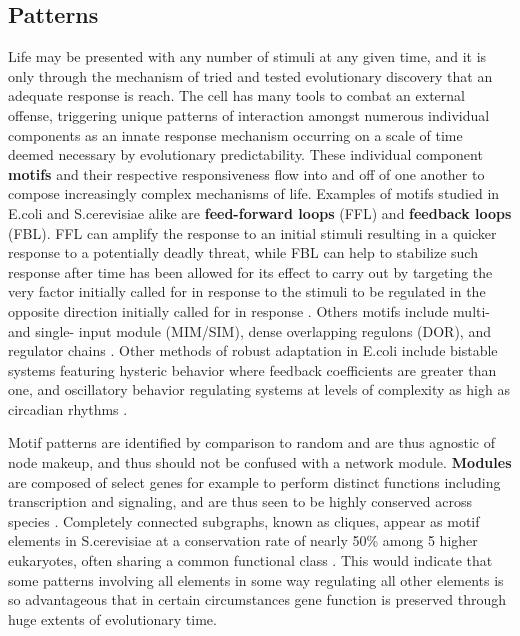 \subsection{Patterns}
\label{sec:pat}
Life may be presented with any number of stimuli at any given time, and it is only through the mechanism of tried and tested evolutionary discovery that an adequate response is reach. The cell has many tools to combat an external offense, triggering unique patterns of interaction amongst numerous individual components as an innate response mechanism occurring on a scale of time deemed necessary by evolutionary predictability. These individual component \textbf{motifs} and their respective responsiveness flow into and off of one another to compose increasingly complex mechanisms of life. Examples of motifs studied in E.coli  and S.cerevisiae alike are \textbf{feed-forward loops} (FFL) and \textbf{feedback loops} (FBL).  FFL can amplify the response to an initial stimuli resulting in a quicker response to a potentially deadly threat, while FBL can help to stabilize such response after time has been allowed for its effect to carry out by targeting the very factor initially called for in response to the stimuli to be regulated in the opposite direction initially called for in response \citep{milo2002network} \citep{mangan2003structure}. Others motifs include multi- and single- input module (MIM/SIM), dense overlapping regulons (DOR), and regulator chains \citep{kalir2005coherent} \citep{lee2002transcriptional}. Other methods of robust adaptation in  E.coli include bistable systems featuring hysteric behavior where feedback coefficients are greater than one, and oscillatory behavior regulating systems at levels of complexity as high as circadian rhythms \citep{szallasi2006system}.

Motif patterns are identified by comparison to random and are thus agnostic of node makeup, and thus should not be confused with a network module. \textbf{Modules} are composed of select genes for example to perform distinct functions including transcription and signaling, and are thus seen to be highly conserved across species \citep{alon2007network}. Completely connected subgraphs, known as cliques, appear as motif elements in S.cerevisiae at a conservation rate of nearly 50\% among 5 higher eukaryotes, often sharing a common functional class \citep{wuchty2003evolutionary}. This would indicate that some patterns involving all elements in some way regulating all other elements is so advantageous that in certain circumstances gene function is preserved through huge extents of evolutionary time.

